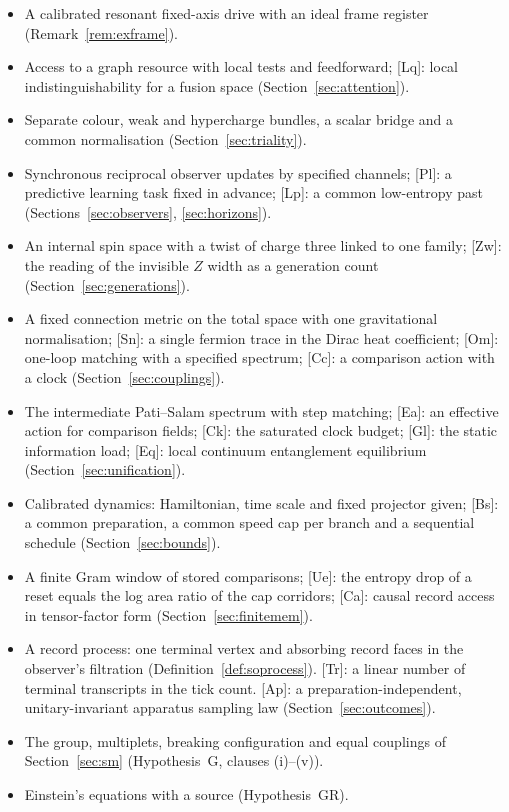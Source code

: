 \documentclass[aps,pra,onecolumn,superscriptaddress,nofootinbib,10pt]{revtex4-2}
\theoremstyle{definition}
\theoremstyle{remark}
\begin{document}
\begin{itemize}[leftmargin=1.6em]
algebra (Hypotheses~U and~A, Section~\ref{sec:closedreg}).
\item[{[Hw]}] A calibrated resonant fixed-axis drive with an ideal frame register (Remark~\ref{rem:exframe}).
\item[{[Ac]}] Access to a graph resource with local tests and feedforward; [Lq]: local indistinguishability for
a fusion space (Section~\ref{sec:attention}).
\item[{[Sb]}] Separate colour, weak and hypercharge bundles, a scalar bridge and a common normalisation
(Section~\ref{sec:triality}).
\item[{[Ou]}] Synchronous reciprocal observer updates by specified channels; [Pl]: a predictive learning task fixed
in advance; [Lp]: a common low-entropy past (Sections~\ref{sec:observers}, \ref{sec:horizons}).
\item[{[Ix]}] An internal spin space with a twist of charge three linked to one family; [Zw]: the reading of the
invisible $Z$ width as a generation count (Section~\ref{sec:generations}).
\item[{[KK]}] A fixed connection metric on the total space with one gravitational normalisation; [Sn]: a
single fermion trace in the Dirac heat coefficient; [Om]: one-loop matching with a specified spectrum; [Cc]: a
comparison action with a clock (Section~\ref{sec:couplings}).
\item[{[Ps]}] The intermediate Pati--Salam spectrum with step matching; [Ea]: an effective action for
comparison fields; [Ck]: the saturated clock budget; [Gl]: the static information load; [Eq]: local
continuum entanglement equilibrium (Section~\ref{sec:unification}).
\item[{[Cd]}] Calibrated dynamics: Hamiltonian, time scale and fixed projector given; [Bs]: a common
preparation, a common speed cap per branch and a sequential schedule (Section~\ref{sec:bounds}).
\item[{[Gw]}] A finite Gram window of stored comparisons; [Ue]: the entropy drop of a reset equals the log
area ratio of the cap corridors; [Ca]: causal record access in tensor-factor form (Section~\ref{sec:finitemem}).
\item[{[R]}] A record process: one terminal vertex and absorbing record faces in the observer's filtration
(Definition~\ref{def:soprocess}).  [Tr]: a linear number of terminal transcripts in the tick count.  [Ap]: a
preparation-independent, unitary-invariant apparatus sampling law (Section~\ref{sec:outcomes}).
\item[{[G]}] The group, multiplets, breaking configuration and equal couplings of
Section~\ref{sec:sm} (Hypothesis~G, clauses (i)--(v)).
\item[{[GR]}] Einstein's equations with a source (Hypothesis~GR).
\end{itemize}
\end{document}
